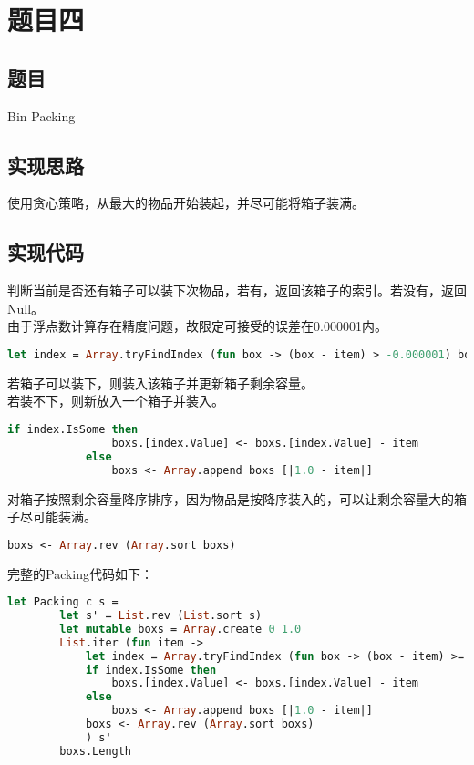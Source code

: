 \documentclass[a4paper]{article}
\begin{document}
\section{题目四}

\subsection{题目}

Bin Packing

\subsection{实现思路}

使用贪心策略，从最大的物品开始装起，并尽可能将箱子装满。

\subsection{实现代码}

判断当前是否还有箱子可以装下次物品，若有，返回该箱子的索引。若没有，返回Null。\\
由于浮点数计算存在精度问题，故限定可接受的误差在0.000001内。

\begin{lstlisting}[language=ML]
            let index = Array.tryFindIndex (fun box -> (box - item) > -0.000001) boxs
\end{lstlisting}

若箱子可以装下，则装入该箱子并更新箱子剩余容量。\\
若装不下，则新放入一个箱子并装入。

\begin{lstlisting}[language=ML]
            if index.IsSome then
                boxs.[index.Value] <- boxs.[index.Value] - item
            else
                boxs <- Array.append boxs [|1.0 - item|]
\end{lstlisting}

对箱子按照剩余容量降序排序，因为物品是按降序装入的，可以让剩余容量大的箱子尽可能装满。

\begin{lstlisting}[language=ML]
            boxs <- Array.rev (Array.sort boxs)
\end{lstlisting}

完整的Packing代码如下：

\begin{lstlisting}[language=ML]
    let Packing c s =
        let s' = List.rev (List.sort s)
        let mutable boxs = Array.create 0 1.0
        List.iter (fun item -> 
            let index = Array.tryFindIndex (fun box -> (box - item) >= -0.000001 ) boxs
            if index.IsSome then
                boxs.[index.Value] <- boxs.[index.Value] - item
            else
                boxs <- Array.append boxs [|1.0 - item|]
            boxs <- Array.rev (Array.sort boxs)
            ) s'
        boxs.Length
\end{lstlisting}
\end{document}
